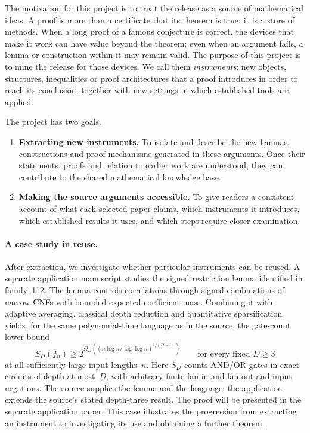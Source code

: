 \documentclass[11pt]{article}
\begin{document}
The motivation for this project is to treat the release as a source of mathematical ideas. A proof is more than a certificate that its theorem is true: it is a store of methods. When a long proof of a famous conjecture is correct, the devices that make it work can have value beyond the theorem; even when an argument fails, a lemma or construction within it may remain valid. The purpose of this project is to mine the release for those devices. We call them \emph{instruments}: new objects, structures, inequalities or proof architectures that a proof introduces in order to reach its conclusion, together with new settings in which established tools are applied.

The project has two goals.
\begin{enumerate}[label=(\roman*)]
\item \textbf{Extracting new instruments.} To isolate and describe the new lemmas, constructions and proof mechanisms generated in these arguments. Once their statements, proofs and relation to earlier work are understood, they can contribute to the shared mathematical knowledge base.
\item \textbf{Making the source arguments accessible.} To give readers a consistent account of what each selected paper claims, which instruments it introduces, which established results it uses, and which steps require closer examination.
\end{enumerate}

\paragraph{A case study in reuse.} After extraction, we investigate whether particular instruments can be reused. A separate application manuscript studies the signed restriction lemma identified in family~\hyperref[fam:112]{112}. The lemma controls correlations through signed combinations of narrow CNFs with bounded expected coefficient mass. Combining it with adaptive averaging, classical depth reduction and quantitative sparsification yields, for the same polynomial-time language as in the source, the gate-count lower bound
\[
 S_D(f_n)\ge 2^{\Omega_D\left((n\log n/\log\log n)^{1/(D-1)}\right)}
 \qquad\text{for every fixed }D\ge3
\]
at all sufficiently large input lengths~$n$. Here $S_D$ counts AND/OR gates in exact circuits of depth at most~$D$, with arbitrary finite fan-in and fan-out and input negations. The source supplies the lemma and the language; the application extends the source's stated depth-three result. The proof will be presented in the separate application paper. This case illustrates the progression from extracting an instrument to investigating its use and obtaining a further theorem.
\end{document}

